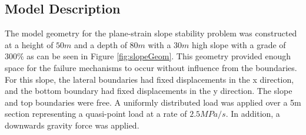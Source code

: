 \subsection{Model Description}

The model geometry for the plane-strain slope stability problem was constructed at a height of $50m$ and a depth of $80m$ with a $30m$ high slope with a grade of $300\%$ as can be seen in Figure \ref{fig:slopeGeom}. This geometry provided enough space for the failure mechanisms to occur without influence from the boundaries. For this slope, the lateral boundaries had fixed displacements in the x direction, and the bottom boundary had fixed displacements in the y direction. The slope and top boundaries were free. A uniformly distributed load was applied over a 5m section representing a quasi-point load at a rate of $2.5 MPa/s$. In addition, a downwards gravity force was applied.
